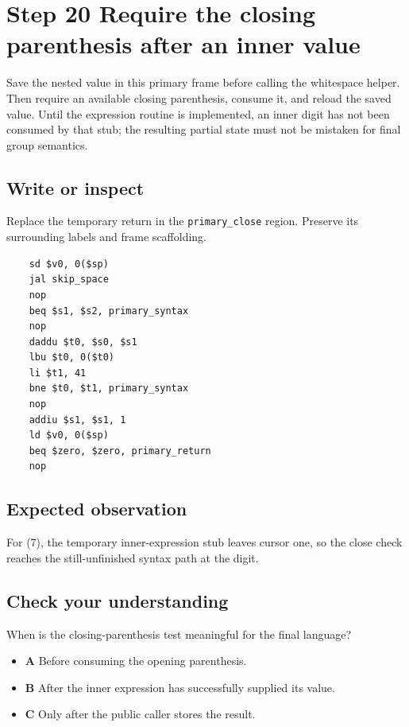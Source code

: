 \section{Step 20 Require the closing parenthesis after an inner value}\label{expression-s20}

Save the nested value in this primary frame before calling the whitespace helper. Then require an available closing parenthesis, consume it, and reload the saved value. Until the expression routine is implemented, an inner digit has not been consumed by that stub; the resulting partial state must not be mistaken for final group semantics.

\subsection{Write or inspect}
Replace the temporary return in the \texttt{primary\_close} region. Preserve its surrounding labels and frame scaffolding.

\begin{verbatim}
    sd $v0, 0($sp)
    jal skip_space
    nop
    beq $s1, $s2, primary_syntax
    nop
    daddu $t0, $s0, $s1
    lbu $t0, 0($t0)
    li $t1, 41
    bne $t0, $t1, primary_syntax
    nop
    addiu $s1, $s1, 1
    ld $v0, 0($sp)
    beq $zero, $zero, primary_return
    nop
\end{verbatim}
\subsection{Expected observation}
For (7), the temporary inner-expression stub leaves cursor one, so the close check reaches the still-unfinished syntax path at the digit.

\subsection{Check your understanding}
When is the closing-parenthesis test meaningful for the final language?

\begin{itemize}
  \item \textbf{A} Before consuming the opening parenthesis.
  \item \textbf{B} After the inner expression has successfully supplied its value.
  \item \textbf{C} Only after the public caller stores the result.
\end{itemize}
